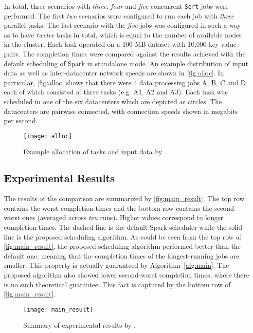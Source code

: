 In total, three scenarios with \emph{three}, \emph{four} and \emph{five} concurrent \texttt{Sort} jobs were performed. The first \emph{two} scenarios were configured to run each job with \emph{three} parallel tasks. The last scenario with the \emph{five} jobs was configured in such a way as to have \emph{twelve} tasks in total, which is equal to the number of available nodes in the cluster. Each task operated on a 100 MB dataset with 10,000 key-value pairs. The completion times were compared against the results achieved with the default scheduling of Spark in standalone mode. An example distribution of input data as well as inter-datacenter network speeds are shown in \autoref{fig:alloc}. In particular, \autoref{fig:alloc} shows that there were 4 data processing jobs A, B, C and D each of which consisted of three tasks (e.g. A1, A2 and A3). Each task was scheduled in one of the six datacenters which are depicted as circles. The datacenters are pairwise connected, with connection speeds shown in megabits per second.

\begin{figure}
  \centering
  \texttt{[image: alloc]} \\
  \caption{Example allocation of tasks and input data by \citet{Chen2017}.}
  \label{fig:alloc}
\end{figure}

\subsection{Experimental Results}

The results of the comparison are summarized by \autoref{fig:main_result}. The top row contains the worst completion times and the bottom row contains the second-worst ones (averaged across \emph{ten} runs). Higher values correspond to longer completion times. The dashed line is the default Spark scheduler while the solid line is the proposed scheduling algorithm. As could be seen from the top row of \autoref{fig:main_result}, the proposed scheduling algorithm performed better than the default one, meaning that the completion times of the longest-running jobs are smaller. This property is actually guaranteed by Algorithm~\ref{alg:main}. The proposed algorithm also showed lower second-worst completion times, where there is no such theoretical guarantee. This fact is captured by the bottom row of \autoref{fig:main_result}.

\begin{figure}
  \centering
  \texttt{[image: main\_result]} \\
  \caption{Summary of experimental results by \citet{Chen2017}.}
  \label{fig:main_result}
\end{figure}

